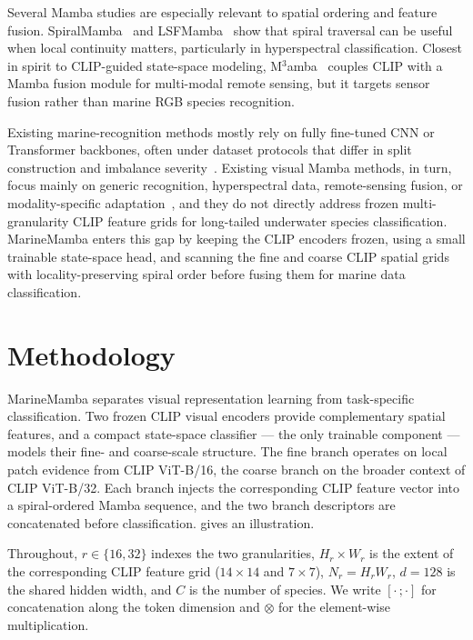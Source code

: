 \documentclass[runningheads]{llncs}
\begin{document}
Several Mamba studies are especially relevant to spatial ordering and feature fusion. SpiralMamba~\cite{spiralmamba} and LSFMamba~\cite{lsfmamba} show that spiral traversal can be useful when local continuity matters, particularly in hyperspectral classification. Closest in spirit to CLIP-guided state-space modeling, M$^3$amba~\cite{cao2025m3amba} couples CLIP with a Mamba fusion module for multi-modal remote sensing, but it targets sensor fusion rather than marine RGB species recognition.

Existing marine-recognition methods mostly rely on fully fine-tuned CNN or Transformer backbones, often under dataset protocols that differ in split construction and imbalance severity~\cite{gonzalez2023underwater}. Existing visual Mamba methods, in turn, focus mainly on generic recognition, hyperspectral data, remote-sensing fusion, or modality-specific adaptation~\cite{zhang2024visualmambasurvey}, and they do not directly address frozen multi-granularity CLIP feature grids for long-tailed underwater species classification. MarineMamba enters this gap by keeping the CLIP encoders frozen, using a small trainable state-space head, and scanning the fine and coarse CLIP spatial grids with locality-preserving spiral order before fusing them for marine data classification.

\section{Methodology}
\label{sec:method}

MarineMamba separates visual representation learning from task-specific classification. Two frozen CLIP visual encoders provide complementary spatial features, and a compact state-space classifier --- the only trainable component --- models their fine- and coarse-scale structure. The fine branch operates on local patch evidence from CLIP ViT-B/16, the coarse branch on the broader context of CLIP ViT-B/32. Each branch injects the corresponding CLIP feature vector into a spiral-ordered Mamba sequence, and the two branch descriptors are concatenated before classification.  gives an illustration.

Throughout, $r\in\{16,32\}$ indexes the two granularities, $H_r\times W_r$ is the extent of the corresponding CLIP feature grid ($14\times14$ and $7\times7$), $N_r=H_rW_r$, $d=128$ is the shared hidden width, and $C$ is the number of species. We write $[\cdot\,;\cdot]$ for concatenation along the token dimension and $\otimes$ for the element-wise multiplication.
\end{document}
